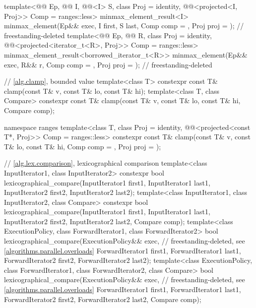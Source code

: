 \begin{codeblock}
{{    template<@@ Ep, @@ I, @@<I> S,
             class Proj = identity,
             @@<projected<I, Proj>> Comp = ranges::less>
      minmax_element_result<I>
        minmax_element(Ep&& exec, I first, S last, Comp comp = {},
                       Proj proj = {});                                     // freestanding-deleted
    template<@@ Ep, @@ R, class Proj = identity,
             @@<projected<iterator_t<R>, Proj>> Comp = ranges::less>
      minmax_element_result<borrowed_iterator_t<R>>
        minmax_element(Ep&& exec, R&& r, Comp comp = {}, Proj proj = {});   // freestanding-deleted
  }

  // \ref{alg.clamp}, bounded value
  template<class T>
    constexpr const T& clamp(const T& v, const T& lo, const T& hi);
  template<class T, class Compare>
    constexpr const T& clamp(const T& v, const T& lo, const T& hi, Compare comp);

  namespace ranges {
    template<class T, class Proj = identity,
             @@<projected<const T*, Proj>> Comp = ranges::less>
      constexpr const T&
        clamp(const T& v, const T& lo, const T& hi, Comp comp = {}, Proj proj = {});
  }

  // \ref{alg.lex.comparison}, lexicographical comparison
  template<class InputIterator1, class InputIterator2>
    constexpr bool
      lexicographical_compare(InputIterator1 first1, InputIterator1 last1,
                              InputIterator2 first2, InputIterator2 last2);
  template<class InputIterator1, class InputIterator2, class Compare>
    constexpr bool
      lexicographical_compare(InputIterator1 first1, InputIterator1 last1,
                              InputIterator2 first2, InputIterator2 last2,
                              Compare comp);
  template<class ExecutionPolicy, class ForwardIterator1, class ForwardIterator2>
    bool
      lexicographical_compare(ExecutionPolicy&& exec,           // freestanding-deleted, see \ref{algorithms.parallel.overloads}
                              ForwardIterator1 first1, ForwardIterator1 last1,
                              ForwardIterator2 first2, ForwardIterator2 last2);
  template<class ExecutionPolicy, class ForwardIterator1, class ForwardIterator2,
           class Compare>
    bool
      lexicographical_compare(ExecutionPolicy&& exec,           // freestanding-deleted, see \ref{algorithms.parallel.overloads}
                              ForwardIterator1 first1, ForwardIterator1 last1,
                              ForwardIterator2 first2, ForwardIterator2 last2,
                              Compare comp);

}
\end{codeblock}
